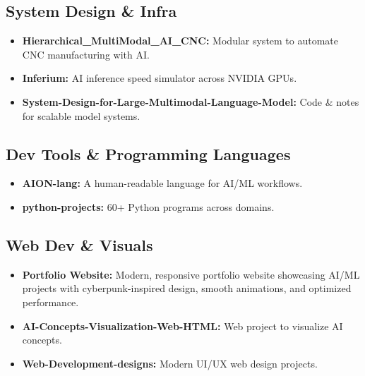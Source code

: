 \documentclass[11pt,a4paper]{article}
\begin{document}
\subsection{System Design \& Infra}
\begin{itemize}
    \item \textbf{Hierarchical\_MultiModal\_AI\_CNC:} Modular system to automate CNC manufacturing with AI.
    \item \textbf{Inferium:} AI inference speed simulator across NVIDIA GPUs.
    \item \textbf{System-Design-for-Large-Multimodal-Language-Model:} Code \& notes for scalable model systems.
\end{itemize}

\subsection{Dev Tools \& Programming Languages}
\begin{itemize}
    \item \textbf{AION-lang:} A human-readable language for AI/ML workflows.
    \item \textbf{python-projects:} 60+ Python programs across domains.
\end{itemize}

\subsection{Web Dev \& Visuals}
\begin{itemize}
    \item \textbf{Portfolio Website:} Modern, responsive portfolio website showcasing AI/ML projects with cyberpunk-inspired design, smooth animations, and optimized performance.
    \item \textbf{AI-Concepts-Visualization-Web-HTML:} Web project to visualize AI concepts.
    \item \textbf{Web-Development-designs:} Modern UI/UX web design projects.
\end{itemize}
\end{document}

